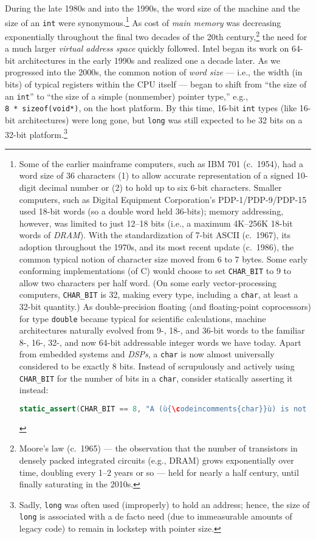During the late 1980s and into the 1990s, the word size of the machine and
the size of an \texttt{int} were synonymous.{\cprotect\footnote{Some of
the earlier mainframe computers, such as IBM 701 (c.~1954), had a word
size of 36 characters (1) to allow accurate representation of a signed
10-digit decimal number or (2) to hold up to six 6-bit characters.
Smaller computers, such as Digital Equipment Corporation's
PDP-1/PDP-9/PDP-15 used 18-bit words (so a double word held 36-bits);
memory addressing, however, was limited to just 12--18 bits (i.e., a
maximum 4K--256K 18-bit words of \emph{DRAM}). With the standardization
of 7-bit ASCII (c.~1967), its adoption throughout the 1970s, and its most
recent update (c.~1986), the common typical notion of character size
moved from 6 to 7 bytes. Some early conforming implementations (of C)
would choose to set \texttt{CHAR\_BIT} to 9 to allow two characters
per half word. (On some early vector-processing computers,
\texttt{CHAR\_BIT} is 32, making every type, including a
\texttt{char}, at least a 32-bit quantity.) As double-precision
floating (and floating-point coprocessors) for type \texttt{double}
became typical for scientific calculations, machine architectures
naturally evolved from 9-, 18-, and 36-bit words to the familiar 8-,
16-, 32-, and now 64-bit addressable integer words we have today.
Apart from embedded systems and \emph{DSPs}, a \texttt{char} is now
almost universally considered to be exactly 8 bits. Instead of
scrupulously and actively using \texttt{CHAR\_BIT} for the number of bits
in a \texttt{char}, consider statically asserting it instead:

\begin{lstlisting}[language=C++, basicstyle={\ttfamily\footnotesize}]
static_assert(CHAR_BIT == 8, "A (ù{\codeincomments{char}}ù) is not 8-bits on this CrAzY platform!");
\end{lstlisting}\vspace*{-1ex}
      }} As cost of \emph{main memory} was decreasing exponentially
throughout the final two decades of the 20th
century,{\cprotect\footnote{Moore's law (c.~1965) --- the observation
that the number of transistors in densely packed integrated circuits
(e.g., DRAM) grows exponentially over time, doubling every 1--2 years
or so --- held for nearly a half century, until finally saturating in
  the 2010s.}} the need for a much larger \emph{virtual address space}
quickly followed. Intel began its work on 64-bit architectures in the
early 1990s and realized one a decade later. As we progressed into
the 2000s, the common notion of \emph{word size} --- i.e., the width (in
bits) of typical registers within the CPU itself --- began to shift from
``the size of an \texttt{int}'' to ``the size of a simple (nonmember)
pointer type,'' e.g., \texttt{8}~\texttt{*}~\texttt{sizeof(void*)}, on the host platform. By this time, 16-bit \texttt{int} types (like
16-bit architectures) were long gone, but \texttt{long} was still
expected to be 32 bits on a 32-bit platform.{\cprotect\footnote{Sadly,
\texttt{long} was often used (improperly) to hold an address; hence,
the size of {\tt long} is associated with a de facto need (due to immeasurable amounts of legacy code) to remain in lockstep with pointer size.}}

